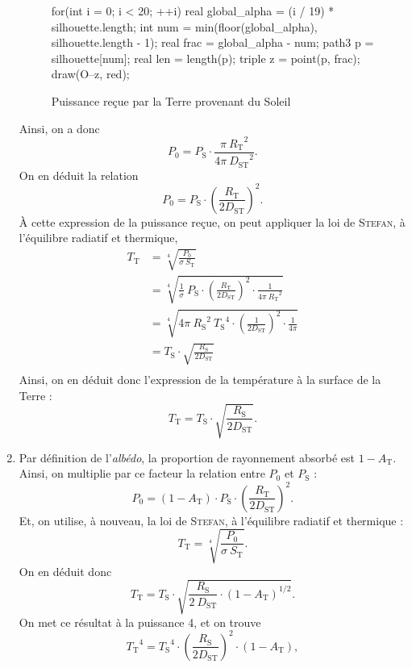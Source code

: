 \documentclass[a4paper, 11pt]{article}
\begin{document}
\begin{multicols}{2}
\begin{enumerate}
\begin{figure}[H]
\begin{asy}
						for(int i = 0; i < 20; ++i) {
							real global_alpha = (i / 19) * silhouette.length;
							int num = min(floor(global_alpha), silhouette.length - 1);
							real frac = global_alpha - num;
							path3 p = silhouette[num];
							real len = length(p);
							triple z = point(p, frac);
							draw(O--z, red);
						}
					\end{asy}
					\caption{Puissance reçue par la Terre provenant du Soleil}
				\end{figure}
				Ainsi, on a donc \[
					P_0 = P_\mathrm{S} \cdot \frac{\pi\: {R_\mathrm{T}}^2}{4\pi\: {D_\mathrm{ST}}^2}
				.\] 
				On en déduit la relation \[
					\boxed{P_0 = P_\mathrm{S} \cdot \left( \frac{R_\mathrm{T}}{2D_\mathrm{ST}} \right)^{\!\!2}.}
				\]
				À cette expression de la puissance reçue, on peut appliquer la loi de \hbox{\textsc{Stefan}}, à l'équilibre radiatif et thermique,
				\begin{align*}
					T_\mathrm{T} &= \sqrt[4]{\frac{P_0}{\sigma\: S_\mathrm{T}}}\\
					&= \sqrt[4]{\frac{1}{\sigma}\: P_\mathrm{S} \cdot \left( \frac{R_\mathrm{T}}{2D_\mathrm{ST}}\right)^{\!\!2} \cdot \frac{1}{4\pi\: {R_\mathrm{T}}^2}}  \\
					&= \sqrt[4]{4\pi\: {R_\mathrm{S}}^2\: {T_\mathrm{S}}^4 \cdot \left(\frac{1}{2D_\mathrm{ST}}\right)^{\!\!2} \cdot \frac{1}{4\pi}}  \\
					&= T_\mathrm{S} \cdot \sqrt{ \frac{R_\mathrm{S}}{2D_\mathrm{ST} }} \\
				\end{align*}
				Ainsi, on en déduit donc l'expression de la température à la surface de la Terre : \[
					\boxed{T_\mathrm{T} = T_\mathrm{S} \cdot \sqrt{\frac{R_\mathrm{S}}{2D_\mathrm{ST}}}  .}
				\]
			\item Par définition de l'\textit{albédo}, la proportion de rayonnement absorbé est $1 - A_\mathrm{T}$. Ainsi, on multiplie par ce facteur la relation entre $P_0$\/ et $P_\mathrm{S}$\/ : \[
					P_0 = (1-A_\mathrm{T}) \cdot P_\mathrm{S} \cdot \left( \frac{R_\mathrm{T}}{2D_\mathrm{ST}} \right)^{\!\!2}
				.\]
				Et, on utilise, à nouveau, la loi de \hbox{\textsc{Stefan}}, à l'équilibre radiatif et thermique :
				\[
					T_\mathrm{T} = \sqrt[4]{\frac{P_0}{\sigma\: S_\mathrm{T}}} 
				.\] On en déduit donc \[
					\boxed{T_\mathrm{T} = T_\mathrm{S} \cdot \sqrt{\frac{R_\mathrm{S}}{2\:D_\mathrm{ST}} \cdot (1-A_\mathrm{T})^{1/2}}.}
				\] On met ce résultat à la puissance 4, et on trouve \[
					\boxed{{T_\mathrm{T}}^4 = {T_\mathrm{S}}^4 \cdot \left( \frac{R_\mathrm{S}}{2D_\mathrm{ST}} \right)^{\!\!2} \cdot (1-A_\mathrm{T}),}
\]
\end{enumerate}
\end{multicols}
\end{document}
